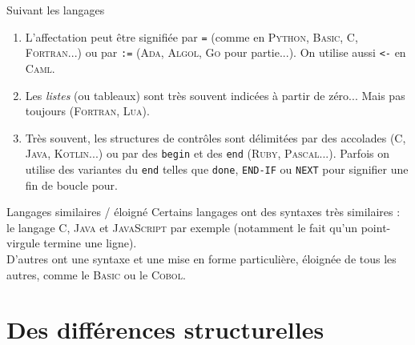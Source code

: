 \documentclass[10pt]{beamer}
\begin{document}
\begin{frame}{Suivant les langages}

\begin{enumerate}[--]
	\item 	L'affectation peut être signifiée par \texttt{=} (comme en \textsc{Python}, \textsc{Basic}, \textsc{C}, \textsc{Fortran}...) ou par \texttt{:=} (\textsc{Ada}, \textsc{Algol}, \textsc{Go} pour partie...). On utilise aussi \texttt{<-} en \textsc{Caml}.\pause
	\item 	Les \textit{listes} (ou tableaux) sont très souvent indicées à partir de zéro... Mais pas toujours (\textsc{Fortran}, \textsc{Lua}).\pause
	\item 	Très souvent, les structures de contrôles sont délimitées par des accolades (\textsc{C}, \textsc{Java},  \textsc{Kotlin}...) ou par des \texttt{begin} et des \texttt{end} (\textsc{Ruby}, \textsc{Pascal}...). Parfois on utilise des variantes du \texttt{end} telles que \texttt{done}, \texttt{END-IF} ou \texttt{NEXT} pour signifier une fin de boucle \og pour\fg{}.
\end{enumerate}
\end{frame}
\begin{frame}{Langages similaires / éloigné}
Certains langages ont des syntaxes très similaires : le langage \textsc{C}, \textsc{Java} et \textsc{JavaScript} par exemple (notamment le fait qu'un point-virgule termine une ligne).\\\pause
D'autres ont une syntaxe et une mise en forme particulière, éloignée de tous les autres, comme le \textsc{Basic} ou le \textsc{Cobol}.
\end{frame}

\section{Des différences structurelles}
\end{document}
